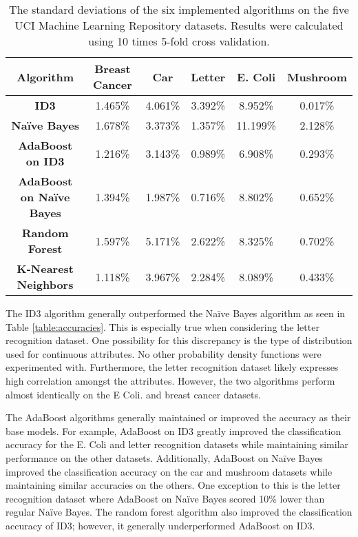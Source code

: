 \documentclass[11pt,titlepage]{article}
\newcommand{\bb}{\textbf}
\begin{document}
\begin{table} [!htbp]
  \begin{tabular}{ |c|c|c|c|c|c| }
    \hline
    \bb{Algorithm}               & \bb{Breast Cancer} & \bb{Car} & \bb{Letter} & \bb{E. Coli}  & \bb{Mushroom} \\ \hline
    \bb{ID3}                     & 1.465\%            & 4.061\%  & 3.392\%     & 8.952\%       & 0.017\%       \\ \hline
    \bb{Naïve Bayes}             & 1.678\%            & 3.373\%  & 1.357\%     & 11.199\%      & 2.128\%       \\ \hline
    \bb{AdaBoost on ID3}         & 1.216\%            & 3.143\%  & 0.989\%     & 6.908\%       & 0.293\%       \\ \hline
    \bb{AdaBoost on Naïve Bayes} & 1.394\%            & 1.987\%  & 0.716\%     & 8.802\%       & 0.652\%       \\ \hline
    \bb{Random Forest}           & 1.597\%            & 5.171\%  & 2.622\%     & 8.325\%       & 0.702\%       \\ \hline
    \bb{K-Nearest Neighbors}     & 1.118\%            & 3.967\%  & 2.284\%     & 8.089\%       & 0.433\%       \\ \hline
  \end{tabular}
  \caption{The standard deviations of the six implemented algorithms on the five UCI Machine Learning Repository datasets. Results were calculated using 10 times 5-fold cross validation.}
\end{table}

The ID3 algorithm generally outperformed the Naïve Bayes algorithm as seen in Table \ref{table:accuracies}. This is especially true when considering the letter recognition dataset. One possibility for this discrepancy is the type of distribution used for continuous attributes. No other probability density functions were experimented with. Furthermore, the letter recognition dataset likely expresses high correlation amongst the attributes. However, the two algorithms perform almost identically on the E Coli. and breast cancer datasets.

The AdaBoost algorithms generally maintained or improved the accuracy as their base models. For example, AdaBoost on ID3 greatly improved the classification accuracy for the E. Coli and letter recognition datasets while maintaining similar performance on the other datasets. Additionally, AdaBoost on Naïve Bayes improved the classification accuracy on the car and mushroom datasets while maintaining similar accuracies on the others. One exception to this is the letter recognition dataset where AdaBoost on Naïve Bayes scored 10\% lower than regular Naïve Bayes. The random forest algorithm also improved the classification accuracy of ID3; however, it generally underperformed AdaBoost on ID3.
\end{document}
